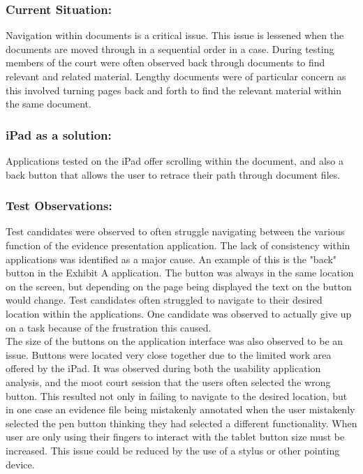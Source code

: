 \documentclass{article}
\begin{document}
\subsubsection{Current Situation:}
Navigation within documents is a critical issue. This issue is lessened when the documents are moved through in a sequential order in a case. During testing members of the court were often observed back through documents to find relevant and related material. Lengthy documents were of particular concern as this involved turning pages back and forth to find the relevant material within the same document.\\
\subsubsection{iPad as a solution:}
Applications tested on the iPad offer scrolling within the document, and also a back button that allows the user to retrace their path through document files.\\
\subsubsection{Test Observations:}
Test candidates were observed to often struggle navigating between the various function of the evidence presentation application. The lack of consistency within applications was identified as a major cause. An example of this is the "back" button in the Exhibit A application. The button was always in the same location on the screen, but depending on the page being displayed the text on the button would change. Test candidates often struggled to navigate to their desired location within the applications. One candidate was observed to actually give up on a task because of the frustration this caused. \\
The size of the buttons on the application interface was also observed to be an issue. Buttons were located very close together due to the limited work area offered by the iPad. It was observed during both the usability application analysis, and the moot court session that the users often selected the wrong button. This resulted not only in failing to navigate to the desired location, but in one case an evidence file being mistakenly annotated when the user mistakenly selected the pen button thinking they had selected a different functionality. When user are only using their fingers to interact with the tablet button size must be increased. This issue could be reduced by the use of a stylus or other pointing device.
\end{document}
